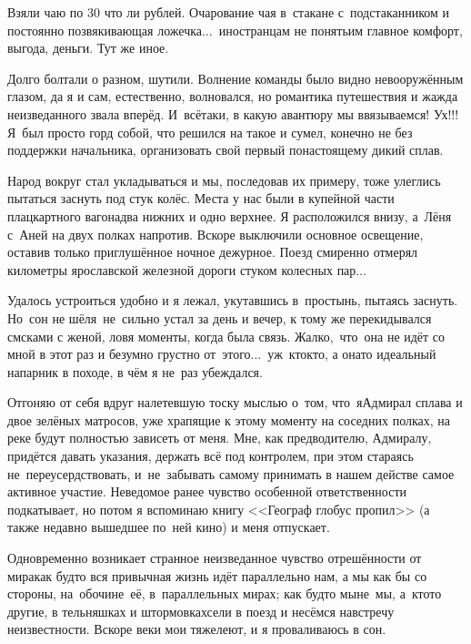 Взяли чаю по 30 что ли рублей. Очарование чая в~стакане с~подстаканником и постоянно позвякивающая ложечка$\ldots$~иностранцам не понять\mdash им главное комфорт, выгода, деньги. Тут же иное. 

Долго болтали о разном, шутили. Волнение команды было видно невооружённым глазом, да я и сам, естественно, волновался, но романтика путешествия и жажда неизведанного звала вперёд. И~всё\sdash таки, в какую авантюру мы ввязываемся! Ух!!! Я~был просто горд собой, что решился на такое и сумел, конечно не без поддержки начальника, организовать свой первый по\sdash настоящему дикий сплав. 

Народ вокруг стал укладываться и мы, последовав их примеру, тоже улеглись пытаться заснуть под стук колёс. Места у нас были в купейной части плацкартного вагона\mdash два нижних и одно верхнее. Я расположился внизу, а~Лёня с~Аней на двух полках напротив. Вскоре выключили основное освещение, оставив только приглушённое ночное дежурное. Поезд смиренно отмерял километры ярославской железной дороги стуком колесных пар$\ldots$

Удалось устроиться удобно и я лежал, укутавшись в~простынь, пытаясь заснуть. Но~сон не шёл\mdash я~не~сильно устал за день и вечер, к тому же перекидывался смс\sdash ками с женой, ловя моменты, когда была связь. Жалко,~что~она не идёт со мной в этот раз и безумно грустно от~этого$\ldots$~уж~кто\sdash кто, а она\sdash то идеальный напарник в походе, в чём я не~раз убеждался.
 
Отгоняю от себя вдруг налетевшую тоску мыслью о~том, что~я\mdash Адмирал сплава и двое зелёных матросов, уже храпящие к этому моменту на соседних полках, на реке будут полностью зависеть от меня. Мне, как предводителю, Адмиралу, придётся давать указания, держать всё под контролем, при этом стараясь не~переусердствовать, и~не~забывать самому принимать в нашем действе самое активное участие. Неведомое ранее чувство особенной ответственности подкатывает, но потом я вспоминаю книгу <<Географ глобус пропил>> \cite{ГеографГлобусПропил} (а также недавно вышедшее по~ней кино) и меня отпускает. 

Одновременно возникает странное неизведанное чувство отрешённости от мира\mdash как будто вся привычная жизнь идёт параллельно нам, а мы как бы со стороны, на~обочине~её, в~параллельных мирах; как будто мы\mdash не~мы, а~кто\sdash то другие, в тельняшках и штормовках\mdash сели в поезд и несёмся навстречу неизвестности. Вскоре веки мои тяжелеют, и я проваливаюсь в сон.

\begin{center}
\end{center}